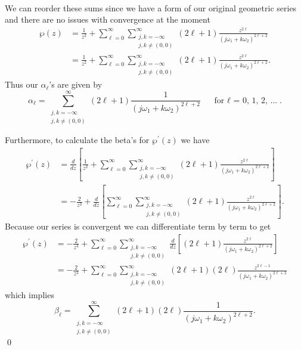 \documentclass[10pt]{amsart}
\theoremstyle{nonumberplain}
\begin{document}
\begin{enumerate}[label={\bf {\arabic*}:}]
\begin{enumerate}
\begin{align*}
\end{align*}
We can reorder these sums since we have a form of our original geometric series and there are no issues with convergence at the moment
\begin{align*}
\wp(z) &= \frac 1 {z^2} + \sum_{\ell=0}^{\infty} \sum_{\substack{j, k=-\infty \\ j,k \neq (0,0)}}^{\infty} (2\ell + 1) \frac {z^{2\ell}} {\left( j \omega_1 + k \omega_2\right)^{2\ell + 2}} \\
	&= \frac 1 {z^2} + \sum_{\ell=0}^{\infty} \sum_{\substack{j, k=-\infty \\ j,k \neq (0,0)}}^{\infty} (2\ell + 1) \frac {z^{2\ell}} {\left( j \omega_1 + k \omega_2\right)^{2\ell + 2}}.
\end{align*}
Thus our $\alpha_\ell$'s are given by
$$
\alpha_\ell = \sum_{\substack{j, k=-\infty \\ j,k \neq (0,0)}}^{\infty} (2\ell + 1) \frac 1 {\left( j \omega_1 + k \omega_2\right)^{2\ell + 2}} \quad \text{ for $\ell$ = 0, 1, 2, ...}.
$$

\noindent
Furthermore, to calculate the beta's for $\wp^\prime(z)$ we have
\begin{align*}
\wp^\prime(z)
	&= \frac d {dz} \left[ \frac 1 {z^2} + \sum_{\ell=0}^{\infty} \sum_{\substack{j, k=-\infty \\ j,k \neq (0,0)}}^{\infty} (2\ell + 1) \frac {z^{2\ell}} {\left( j \omega_1 + k \omega_2\right)^{2\ell + 2}} \right] \\
	&= - \frac 2 {z^3} + \frac d {dz} \left[ \sum_{\ell=0}^{\infty} \sum_{\substack{j, k=-\infty \\ j,k \neq (0,0)}}^{\infty} (2\ell + 1) \frac {z^{2\ell}} {\left( j \omega_1 + k \omega_2\right)^{2\ell + 2}} \right].
\end{align*}
Because our series is convergent we can differentiate term by term to get
\begin{align*}
\wp^\prime(z)
	&= - \frac 2 {z^3} + \sum_{\ell=0}^{\infty} \sum_{\substack{j, k=-\infty \\ j,k \neq (0,0)}}^{\infty} \frac d {dz} \left[  (2\ell + 1) \frac {z^{2\ell}} {\left( j \omega_1 + k \omega_2\right)^{2\ell + 2}} \right] \\
	&= - \frac 2 {z^3} + \sum_{\ell=0}^{\infty} \sum_{\substack{j, k=-\infty \\ j,k \neq (0,0)}}^{\infty} (2\ell + 1)(2\ell) \frac {z^{2\ell - 1}} {\left( j \omega_1 + k \omega_2\right)^{2\ell + 2}}
\end{align*}
which implies
$$
\beta_\ell = \sum_{\substack{j, k=-\infty \\ j,k \neq (0,0)}}^{\infty} (2\ell + 1)(2\ell) \frac 1 {\left( j \omega_1 + k \omega_2\right)^{2\ell + 2}}.
$$
\qed \\
\newpage


\end{enumerate}
\end{enumerate}
\end{document}
